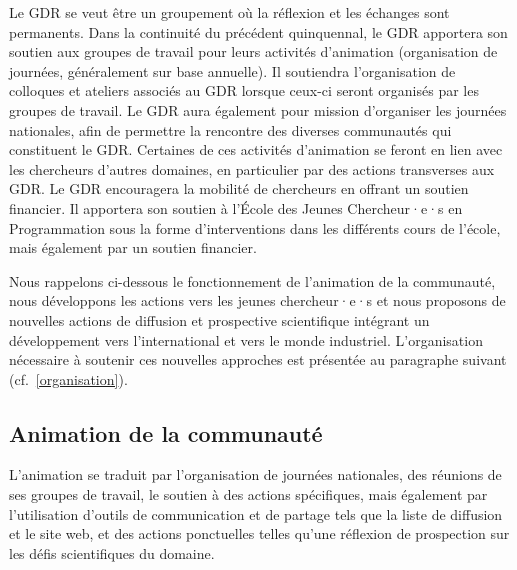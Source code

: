 \documentclass[11pt]{article}
\newcommand{\cf}[0]{cf.~}
\begin{document}

Le GDR se veut être un groupement où la réflexion et les échanges sont permanents.
Dans la continuité du précédent quinquennal, le GDR apportera  son soutien aux groupes de travail pour leurs activités d'animation (organisation de journées, généralement sur base annuelle). 
Il soutiendra l'organisation de colloques et ateliers associés au GDR lorsque ceux-ci seront organisés par les groupes de travail.
Le GDR aura également pour mission d'organiser les journées nationales, afin de permettre la rencontre des diverses communautés qui constituent le GDR. Certaines de ces activités d'animation se feront en lien avec les chercheurs d'autres domaines, en particulier par des actions transverses aux GDR.
Le GDR encouragera la mobilité de chercheurs en offrant un soutien financier. Il apportera son soutien à l'École des Jeunes Chercheur·e·s en Programmation sous la forme d'interventions dans les différents cours de l'école, mais également par un soutien financier. 

Nous rappelons ci-dessous le fonctionnement de l'animation de la communauté, nous développons les actions vers les jeunes chercheur·e·s et nous  proposons de nouvelles actions de diffusion et prospective scientifique intégrant un  développement vers l'international et vers le monde industriel.
L'organisation nécessaire à soutenir ces nouvelles approches est présentée au paragraphe suivant (\cf \ref{organisation}).

\subsection{Animation de la communauté}
L'animation se traduit par
    l'organisation de journées nationales, 
    des réunions de ses groupes de travail,
    le soutien à des actions spécifiques, 
    mais également par l'utilisation d'outils de communication
    et de partage tels que la liste de diffusion et le site web, et des actions ponctuelles telles qu'une réflexion de prospection sur les défis scientifiques du domaine.
    
\end{document}
